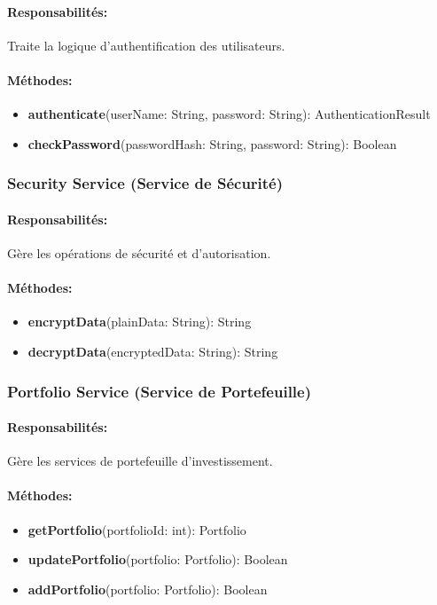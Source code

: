 \documentclass{article}
\begin{document}
\paragraph{Responsabilités:} Traite la logique d'authentification des utilisateurs.
\paragraph{Méthodes:}
\begin{itemize}
  \item \textbf{authenticate}(userName: String, password: String): AuthenticationResult
  \item \textbf{checkPassword}(passwordHash: String, password: String): Boolean
\end{itemize}
\subsubsection{Security Service (Service de Sécurité)}
\paragraph{Responsabilités:} Gère les opérations de sécurité et d'autorisation.
\paragraph{Méthodes:}
\begin{itemize}
  \item \textbf{encryptData}(plainData: String): String
  \item \textbf{decryptData}(encryptedData: String): String
\end{itemize}
\subsubsection{Portfolio Service (Service de Portefeuille)}
\paragraph{Responsabilités:} Gère les services de portefeuille d'investissement.
\paragraph{Méthodes:}
\begin{itemize}
  \item \textbf{getPortfolio}(portfolioId: int): Portfolio
  \item \textbf{updatePortfolio}(portfolio: Portfolio): Boolean
  \item \textbf{addPortfolio}(portfolio: Portfolio): Boolean
\end{itemize}
\end{document}
